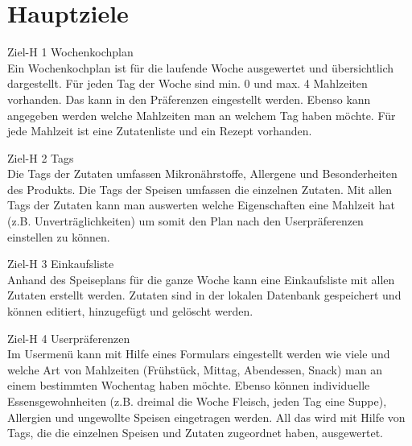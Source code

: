 \section{Hauptziele}
\begin{description}
\item Ziel-H 1      Wochenkochplan\\
Ein Wochenkochplan ist für die laufende Woche ausgewertet und übersichtlich dargestellt. Für jeden Tag der Woche sind min. 0 und max. 4 Mahlzeiten vorhanden. Das kann in den Präferenzen eingestellt werden. Ebenso kann angegeben werden welche Mahlzeiten man an welchem Tag haben möchte. Für jede Mahlzeit ist eine Zutatenliste und ein Rezept vorhanden.  

\item Ziel-H 2      Tags\\
Die Tags der Zutaten umfassen Mikronährstoffe, Allergene und Besonderheiten des Produkts. Die Tags der Speisen umfassen die einzelnen Zutaten. Mit allen Tags der Zutaten kann man auswerten welche Eigenschaften eine Mahlzeit hat (z.B. Unverträglichkeiten) um somit den Plan nach den Userpräferenzen einstellen zu können. 

\item Ziel-H 3      Einkaufsliste\\
Anhand des Speiseplans für die ganze Woche kann eine Einkaufsliste mit allen Zutaten erstellt werden. Zutaten sind in der lokalen Datenbank gespeichert und können editiert, hinzugefügt und gelöscht werden.  

\item Ziel-H 4      Userpräferenzen\\
Im Usermenü kann mit Hilfe eines Formulars eingestellt werden wie viele und welche Art von Mahlzeiten (Frühstück, Mittag, Abendessen, Snack) man an einem bestimmten Wochentag haben möchte. Ebenso können individuelle Essensgewohnheiten (z.B. dreimal die Woche Fleisch, jeden Tag eine Suppe), Allergien und ungewollte Speisen eingetragen werden. All das wird mit Hilfe von Tags, die die einzelnen Speisen und Zutaten zugeordnet haben, ausgewertet.


\end{description}

